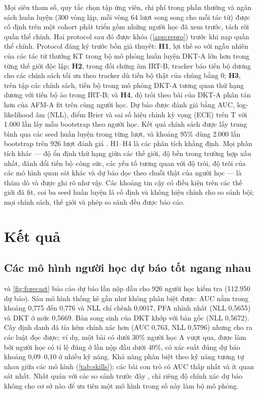 \documentclass[a4paper,preprint,12pt,authoryear]{elsarticle}
\begin{document}
Mọi siêu tham số, quy tắc chọn tập ứng viên, chi phí trong phần thưởng và ngân sách huấn luyện (300 vòng lặp, mỗi vòng 64 lượt song song cho mỗi tác tử) được cố định trên một cohort phát triển gồm những người học đã xem trước, tách rời quần thể chính. Hai protocol sau đó được khóa (\ref{app:repro}) trước khi nạp quần thể chính. Protocol đăng ký trước bốn giả thuyết: \textbf{H1}, lợi thế so với ngẫu nhiên của các tác tử thưởng KT trong bộ mô phỏng huấn luyện DKT-A lớn hơn trong từng thế giới độc lập; \textbf{H2}, trong đối chứng âm IRT-B, tracker báo tiến bộ dương cho các chính sách tối ưu theo tracker dù tiến bộ thật của chúng bằng 0; \textbf{H3}, trên tập các chính sách, tiến bộ trong mô phỏng DKT-A tương quan thứ hạng dương với tiến bộ ảo trong IRT-B; và \textbf{H4}, độ trôi theo bài của DKT-A phân tán hơn của AFM-A fit trên cùng người học. Dự báo được đánh giá bằng AUC, log-likelihood âm (NLL), điểm Brier và sai số hiệu chỉnh kỳ vọng (ECE) trên T với 1.000 lần lấy mẫu bootstrap theo người học. Kết quả chính sách được lấy trung bình qua các seed huấn luyện trong từng lượt, và khoảng 95\% dùng 2.000 lần bootstrap trên 926 lượt đánh giá \citep{efron1993bootstrap}. H1--H4 là các phân tích khẳng định. Mọi phân tích khác — độ ổn định thứ hạng giữa các thế giới, độ bền trong trường hợp xấu nhất, đánh đổi tiến bộ--công sức, các yếu tố tương quan với độ trôi, độ trôi của các mô hình quan sát khác và dự báo dọc theo chuỗi thật của người học — là thăm dò và được ghi rõ như vậy. Các khoảng tin cậy có điều kiện trên các thế giới đã fit, coi ba seed huấn luyện là cố định và không hiệu chỉnh cho so sánh bội; mọi chính sách, thế giới và phép so sánh đều được báo cáo.

\section{Kết quả}\label{sec:results}

\subsection{Các mô hình người học dự báo tốt ngang nhau}\label{sec:res-forecast}

 và \cref{fig:forecast} báo cáo dự báo lần nộp đầu cho 926 người học kiểm tra (112.950 dự báo). Sáu mô hình thống kê gần như không phân biệt được: AUC nằm trong khoảng 0{,}775 đến 0{,}776 và NLL chỉ chênh 0{,}0017, PFA nhỉnh nhất (NLL 0{,}5655) và DKT ở mức 0{,}5669. Bản song sinh của DKT khớp với bản gốc (NLL 0{,}5672). Cây định danh đã tỉa kém chính xác hơn (AUC 0{,}763, NLL 0{,}5796) nhưng cho ra các luật đọc được; ví dụ, một bài có dưới 30\% người học A vượt qua, được làm bởi người học có tỉ lệ đúng ở lần nộp đầu dưới 40\%, có xác suất đúng dự báo khoảng 0,09--0,10 ở nhiều kỹ năng. Khả năng phân biệt theo kỹ năng tương tự nhau giữa các mô hình (\cref{tab:skills}); các bài con trỏ có AUC thấp nhất và ít quan sát nhất. Nhất quán với các so sánh trước đây \citep{khajah2016deep,wilson2016basics,gervet2020deep}, chỉ riêng độ chính xác dự báo không cho cơ sở nào để ưu tiên một mô hình trong số này làm bộ mô phỏng.
\end{document}
